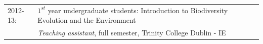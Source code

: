 \documentclass[10pt,a4paper]{article}
\begin{document}
{%
\begin{tabular}{ll}
2012-13: & $1^{st}$ year undergraduate students: Introduction to Biodiversity Evolution and the Environment\\
         & \textit{Teaching assistant}, full semester, Trinity College Dublin - IE\\
\end{tabular}


\bigskip




}
\end{document}

